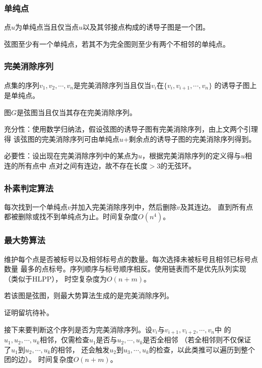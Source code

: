 \subsubsection{单纯点}
点$u$为单纯点当且仅当点$u$以及其邻接点构成的诱导子图是一个团。
\begin{lemma}
    弦图至少有一个单纯点，若其不为完全图则至少有两个不相邻的单纯点。
\end{lemma}
\subsubsection{完美消除序列}
点集的序列$v_1,v_2,\cdots,v_n$是完美消除序列当且仅当$v_i$在$\{v_i,v_{i+1},\cdots,v_n\}$
的诱导子图上是单纯点。
\begin{theorem}
    图$G$是弦图当且仅当其存在完美消除序列。
\end{theorem}

充分性：使用数学归纳法，假设弦图的诱导子图有完美消除序列，由上文两个引理得
该弦图的完美消除序列可由单纯点$u$+剩余点的诱导子图的完美消除序列得到。

必要性：设出现在完美消除序列中的某点为$u$，根据完美消除序列的定义得与$u$相连的所有点中
点对之间有连边，故不存在长度$>3$的无弦环。
\subsubsection{朴素判定算法}
每次找到一个单纯点$v$并加入完美消除序列中，然后删除$v$及其连边。
直到所有点都被删除或找不到单纯点为止。时间复杂度$O(n^4)$。
\subsubsection{最大势算法}
维护每个点是否被标号以及相邻标号点的数量。每次选择未被标号且相邻已标号点数量
最多的点标号。序列顺序与标号顺序相反。使用链表而不是优先队列实现（类似于HLPP），
时空复杂度为$O(n+m)$。

\begin{theorem}
    若该图是弦图，则最大势算法生成的是完美消除序列。
\end{theorem}
证明留坑待补。

接下来要判断这个序列是否为完美消除序列。设$v_i$与${v_{i+1},v_{i+2},\cdots,v_n}$中
的$u_1,u_2,\cdots,u_k$相邻，仅需检查$u_1$是否与$u_2,\cdots,u_k$是否全相邻
（若全相邻则不仅保证了$u_1$到$u_2,\cdots,u_k$的相邻，
还会触发$u_2$到$u_3,\cdots,u_k$的检查，以此类推可以遍历到整个团的边）。
时间复杂度$O(n+m)$。

